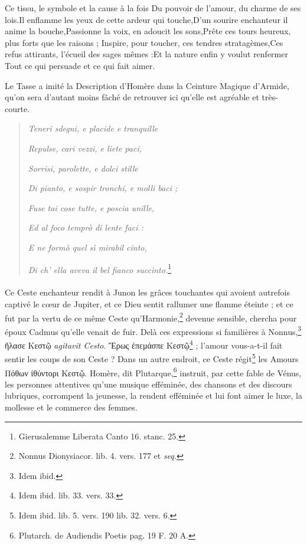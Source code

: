 \documentclass[a4paper, 11pt, oneside, polutonikogreek, french]{article}
\begin{document}
Ce tissu, le symbole et la cause à la fois Du pouvoir de l'amour, du charme de ses lois.Il enflamme les yeux de cette ardeur qui touche,D'un sourire enchanteur il anime la bouche,Passionne la voix, en adoucit les sons,Prête ces tours heureux, plus forts que les raisons ; Inspire, pour toucher, ces tendres stratagèmes,Ces refus attirants, l'écueil des sages mêmes :Et la nature enfin y voulut renfermer Tout ce qui persuade et ce qui fait aimer.

Le Tasse a imité la Description d'Homère dans la Ceinture Magique d'Armide, qu'on sera d'autant moins fâché de retrouver ici qu'elle est agréable et très-courte.
\begin{quotation}
\emph{Teneri sdegni, e placide e tranquille}

\emph{Repulse, cari vezzi, e liete paci,}

\emph{Sorrisi, parolette, e dolci stille}

\emph{Di pianto, e sospir tronchi, e molli baci ;}

\emph{Fuse tai cose tutte, e poscia unille,}

\emph{Ed al foco temprò di lente faci :}

\emph{E ne formò quel sì mirabil cinto,}

\emph{Di ch' ella aveva il bel fianco succinto.}\footnote{Gierusalemme Liberata Canto 16. stanc. 25.}
\end{quotation}
\paragraph{}
Ce Ceste enchanteur rendit à Junon les grâces touchantes qui avoient autrefois captivé le cœur de Jupiter, et ce Dieu sentit rallumer une flamme éteinte ; et ce fut par la vertu de ce même Ceste qu'Harmonie,\footnote{Nonnus Dionysiacor. lib. 4. vers. 177 et \emph{seq.}} devenue sensible, chercha pour époux Cadmus qu'elle venait de fuir. Delà ces expressions si familières à Nonnus,\footnote{Idem ibid.} ἤλασε Κεστῷ \emph{agitavit Cesto}. Ἔρως ἐπεμάσπε Κεστῷ\footnote{Idem ibid. lib. 33. vers. 33.} ; l'amour vous-a-t-il fait sentir les coups de son Ceste ? Dans un autre endroit, ce Ceste régit\footnote{Idem ibid. lib. 5. vers. 190 lib. 32. vers. 6.} les Amours Πόθων ἰθύντορι Κεστῷ. Homère, dit Plutarque,\footnote{Plutarch. de Audiendis Poetis pag. 19 F. 20 A.} instruit, par cette fable de Vénus, les personnes attentives qu'une musique efféminée, des chansons et des discours lubriques, corrompent la jeunesse, la rendent efféminée et lui font aimer le luxe, la mollesse et le commerce des femmes.
\end{document}
